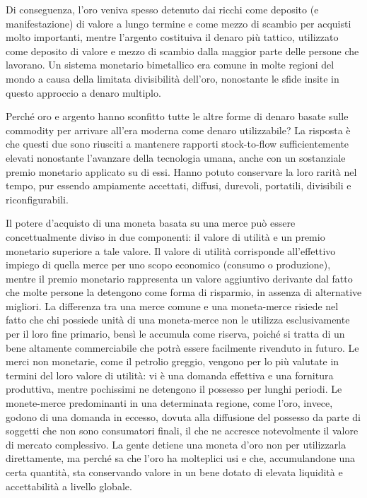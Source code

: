\documentclass[
  a5paper,
  smalldemyvopaper,10pt,twoside,onecolumn,openright,extrafontsizes,hidelinks]{memoir}
\begin{document}
Di conseguenza, l'oro veniva spesso detenuto dai ricchi come deposito (e
manifestazione) di valore a lungo termine e come mezzo di scambio per
acquisti molto importanti, mentre l'argento costituiva il denaro più
tattico, utilizzato come deposito di valore e mezzo di scambio dalla
maggior parte delle persone che lavorano. Un sistema monetario
bimetallico era comune in molte regioni del mondo a causa della limitata
divisibilità dell'oro, nonostante le sfide insite in questo approccio a
denaro multiplo.

Perché oro e argento hanno sconfitto tutte le altre forme di denaro
basate sulle commodity per arrivare all'era moderna come denaro
utilizzabile? La risposta è che questi due sono riusciti a mantenere
rapporti stock-to-flow sufficientemente elevati nonostante l'avanzare
della tecnologia umana, anche con un sostanziale premio monetario
applicato su di essi. Hanno potuto conservare la loro rarità nel tempo,
pur essendo ampiamente accettati, diffusi, durevoli, portatili,
divisibili e riconfigurabili.

Il potere d'acquisto di una moneta basata su una merce può essere
concettualmente diviso in due componenti: il valore di utilità e un
premio monetario superiore a tale valore. Il valore di utilità
corrisponde all'effettivo impiego di quella merce per uno scopo
economico (consumo o produzione), mentre il premio monetario rappresenta
un valore aggiuntivo derivante dal fatto che molte persone la detengono
come forma di risparmio, in assenza di alternative migliori. La
differenza tra una merce comune e una moneta-merce risiede nel fatto che
chi possiede unità di una moneta-merce non le utilizza esclusivamente
per il loro fine primario, bensì le accumula come riserva, poiché si
tratta di un bene altamente commerciabile che potrà essere facilmente
rivenduto in futuro. Le merci non monetarie, come il petrolio greggio,
vengono per lo più valutate in termini del loro valore di utilità: vi è
una domanda effettiva e una fornitura produttiva, mentre pochissimi ne
detengono il possesso per lunghi periodi. Le monete-merce predominanti
in una determinata regione, come l'oro, invece, godono di una domanda in
eccesso, dovuta alla diffusione del possesso da parte di soggetti che
non sono consumatori finali, il che ne accresce notevolmente il valore
di mercato complessivo. La gente detiene una moneta d'oro non per
utilizzarla direttamente, ma perché sa che l'oro ha molteplici usi e
che, accumulandone una certa quantità, sta conservando valore in un bene
dotato di elevata liquidità e accettabilità a livello globale.
\end{document}
